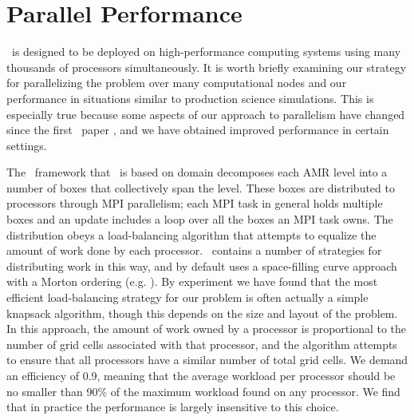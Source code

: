\documentclass[12pt]{article}
\begin{document}
\clearpage
\section{Parallel Performance}
\label{sec:performance}

\castro\ is designed to be deployed on high-performance computing systems using
many thousands of processors simultaneously. It is worth briefly examining
our strategy for parallelizing the problem over many computational nodes
and our performance in situations similar to production science simulations.
This is especially true because some aspects of our approach to parallelism
have changed since the first \castro\ paper \citep{castro}, and we have obtained improved
performance in certain settings.

The \boxlib\ framework that \castro\ is based on domain decomposes each AMR level into a number
of boxes that collectively span the level. These boxes are distributed to processors
through MPI parallelism; each MPI task in general holds multiple boxes and
an update includes a loop over all the boxes an MPI task owns. The distribution
obeys a load-balancing algorithm that attempts to equalize the amount of work
done by each processor. \boxlib\ contains a number of strategies for distributing
work in this way, and by default uses a space-filling curve approach with a
Morton ordering (e.g. \citealt{sasidharan:2015,beichl:1998}). By experiment we have
found that the most efficient load-balancing strategy for our problem is often
actually a simple knapsack algorithm, though this depends on the size and layout of
the problem. In this approach,
the amount of work owned by a processor is proportional to the number of grid cells
associated with that processor, and the algorithm attempts to ensure that all
processors have a similar number of total grid cells. We demand an efficiency of 0.9,
meaning that the average workload per processor should be no smaller than 90\% of the
maximum workload found on any processor. We find that in practice the
performance is largely insensitive to this choice.
\end{document}

